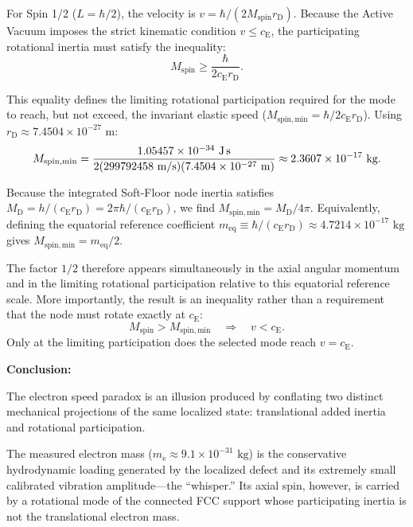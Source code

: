 For Spin 1/2 ($L = \hbar/2$), the velocity is $v = \hbar / (2M_{\mathrm{spin}}r_{\mathrm D})$. Because the Active Vacuum imposes the strict kinematic condition $v \leq c_{\mathrm E}$, the participating rotational inertia must satisfy the inequality:
\begin{equation}
    M_{\mathrm{spin}} \geq \frac{\hbar}{2c_{\mathrm E}r_{\mathrm D}}.
\end{equation}

This equality defines the limiting rotational participation required for the mode to reach, but not exceed, the invariant elastic speed ($M_{\mathrm{spin,min}} = \hbar / 2c_{\mathrm E}r_{\mathrm D}$). Using $r_{\mathrm D} \approx 7.4504\times10^{-27}\text{ m}$:
\begin{equation}
    M_{\mathrm{spin,min}} 
    = 
    \frac{1.05457\times10^{-34}\text{ J\,s}}{2(299792458\text{ m/s})(7.4504\times10^{-27}\text{ m})} 
    \approx 2.3607\times10^{-17}\text{ kg}.
\end{equation}

Because the integrated Soft-Floor node inertia satisfies $M_{\mathrm D} = h / (c_{\mathrm E}r_{\mathrm D}) = 2\pi\hbar / (c_{\mathrm E}r_{\mathrm D})$, we find $M_{\mathrm{spin,min}} = M_{\mathrm D} / 4\pi$. Equivalently, defining the equatorial reference coefficient $m_{\mathrm{eq}} \equiv \hbar / (c_{\mathrm E}r_{\mathrm D}) \approx 4.7214\times10^{-17}\text{ kg}$ gives $M_{\mathrm{spin,min}} = m_{\mathrm{eq}}/2$. 

The factor $1/2$ therefore appears simultaneously in the axial angular momentum and in the limiting rotational participation relative to this equatorial reference scale. More importantly, the result is an inequality rather than a requirement that the node must rotate exactly at $c_{\mathrm E}$:
\begin{equation}
    M_{\mathrm{spin}} > M_{\mathrm{spin,min}} \quad\Longrightarrow\quad v < c_{\mathrm E}.
\end{equation}
Only at the limiting participation does the selected mode reach $v = c_{\mathrm E}$.

\vspace{0.5em}
\noindent\textbf{Conclusion:}

The electron speed paradox is an illusion produced by conflating two distinct mechanical projections of the same localized state: translational added inertia and rotational participation. 

The measured electron mass ($m_{\mathrm e} \approx 9.1\times10^{-31}\text{ kg}$) is the conservative hydrodynamic loading generated by the localized defect and its extremely small calibrated vibration amplitude---the ``whisper.'' Its axial spin, however, is carried by a rotational mode of the connected FCC support whose participating inertia is not the translational electron mass. 

